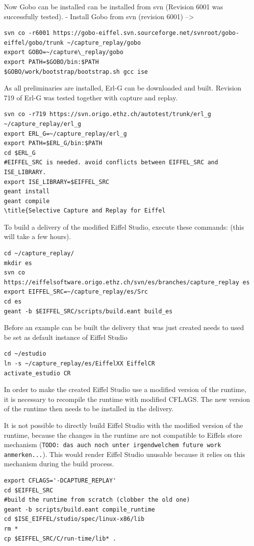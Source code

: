 Now Gobo \cite{gobo} can be installed can be installed from svn (Revision 6001 was successfully tested).
- Install Gobo  from svn (revision 6001) -->
\begin{lstlisting}
svn co -r6001 https://gobo-eiffel.svn.sourceforge.net/svnroot/gobo-eiffel/gobo/trunk ~/capture_replay/gobo
export GOBO=~/capture\_replay/gobo
export PATH=$GOBO/bin:$PATH
$GOBO/work/bootstrap/bootstrap.sh gcc ise
\end{lstlisting}

As all preliminaries are installed, Erl-G \cite{erlg} can be downloaded and built. Revision 719 of Erl-G was tested together with capture and replay.
\begin{lstlisting}
svn co -r719 https://svn.origo.ethz.ch/autotest/trunk/erl_g ~/capture_replay/erl_g
export ERL_G=~/capture_replay/erl_g
export PATH=$ERL_G/bin:$PATH
cd $ERL_G
#EIFFEL_SRC is needed. avoid conflicts between EIFFEL_SRC and ISE_LIBRARY.
export ISE_LIBRARY=$EIFFEL_SRC
geant install
geant compile
\title{Selective Capture and Replay for Eiffel
\end{lstlisting}

To build a delivery of the modified Eiffel Studio, execute these commands: (this will take a few hours).
\begin{lstlisting}
cd ~/capture_replay/
mkdir es
svn co https://eiffelsoftware.origo.ethz.ch/svn/es/branches/capture_replay es
export EIFFEL_SRC=~/capture_replay/es/Src
cd es
geant -b $EIFFEL_SRC/scripts/build.eant build_es
\end{lstlisting}

Before an example can be built the delivery that was just created needs to used be set as default instance of Eiffel Studio
\begin{lstlisting}
cd ~/estudio
ln -s ~/capture_replay/es/EiffelXX EiffelCR
activate_estudio CR
\end{lstlisting}

In order to make the created Eiffel Studio use a modified version of the runtime, it is necessary to recompile the runtime with modified CFLAGS. The new version of the runtime then needs to be installed in the delivery.

It is not possible to directly build Eiffel Studio with the modified version of the runtime, because the changes in the runtime are not compatible to Eiffels store mechanism (\texttt{TODO: das auch noch unter irgendwelchem future work anmerken...}). This would render Eiffel Studio unusable because it relies on this mechanism during the build process.
\begin{lstlisting}
export CFLAGS='-DCAPTURE_REPLAY' 
cd $EIFFEL_SRC
#build the runtime from scratch (clobber the old one)
geant -b scripts/build.eant compile_runtime
cd $ISE_EIFFEL/studio/spec/linux-x86/lib
rm *
cp $EIFFEL_SRC/C/run-time/lib* .
\end{lstlisting}


